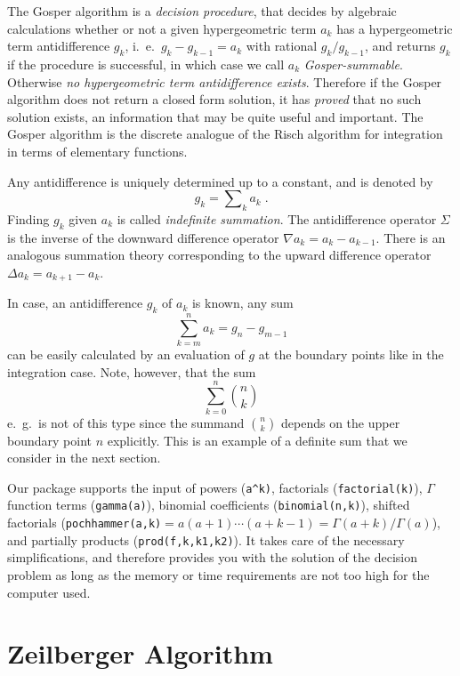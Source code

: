 The Gosper algorithm \cite{Gos} is a {\sl decision procedure}, that
decides by algebraic calculations whether or not a given hypergeometric term
$a_k$ has a hypergeometric term antidifference $g_k$, i.\ e.\
$g_{k}-g_{k-1}=a_k$ with rational $g_k/g_{k-1}$,
and returns $g_k$ if the procedure is successful, in which
case we call $a_k$ {\sl Gosper-summable}. Otherwise
{\sl no hypergeometric term antidifference exists}. Therefore
if the Gosper algorithm does not return a closed form solution,
it has {\sl proved} that no such solution exists, an information
that may be quite useful and important.
The Gosper algorithm is the discrete analogue of the Risch algorithm
for integration in terms of elementary functions.

Any antidifference is uniquely determined up to a constant, and is
denoted by
\[
g_k=\sum\nolimits_k a_k
\;.
\]
Finding $g_k$ given $a_k$ is called {\sl indefinite summation}.
The antidifference operator $\Sigma$ is the inverse of the downward
difference operator $\nabla a_k=a_{k}-a_{k-1}$. There is an analogous
summation theory corresponding to the upward difference operator
$\Delta a_k=a_{k+1}-a_k$.

In case, an antidifference $g_k$ of $a_k$ is known, any sum
\[
\sum_{k=m}^{n} a_k=g_{n}-g_{m-1}
\]
can be easily calculated by an evaluation of $g$ at the boundary points
like in the integration case. Note, however, that the sum
\begin{equation}
\sum_{k=0}^n {{n}\choose{k}}
\label{eq:nchoosek}
\end{equation}
e.\ g.\
is not of this type since the summand ${{n}\choose{k}}$ depends on the upper
boundary point $n$ explicitly. This is an example of a definite sum
that we consider in the next section.

Our package supports the input of powers ({\tt a\verb+^+k)},
factorials ({\tt factorial(k)}),
$\Gamma$ function terms ({\tt gamma(a)}), binomial coefficients
({\tt binomial(n,k)}), shifted factorials
({\tt pochhammer(a,k)$=a(a+1)\cdots(a+k-1)=\Gamma (a+k)/\Gamma (a)$}), and
partially products ({\tt prod(f,k,k1,k2)}).
It takes care of the necessary simplifications, and therefore
provides you with the solution of the decision problem
as long as the memory or time requirements are not too high for the
computer used.

\section{Zeilberger Algorithm}

